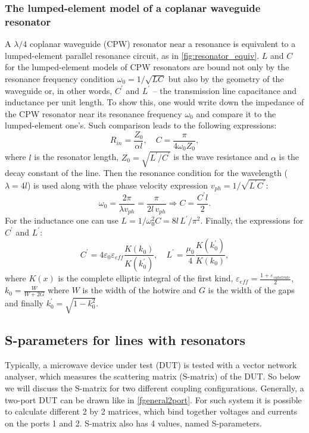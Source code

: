 \documentclass[12pt, twoside]{report}
\numberwithin{equation}{section}
\begin{document}
\subsubsection{The lumped-element model of a coplanar waveguide resonator}\label{ssec:LE-model}
A $\lambda/4$ coplanar waveguide (CPW) resonator near a resonance is equivalent to a lumped-element parallel resonance circuit, as in \autoref{fig:resonator_equiv}. $L$ and $C$ for the lumped-element models of CPW resonators are bound not only by the resonance frequency condition $\omega_0 = 1/\sqrt{LC}$ but also by the geometry of the waveguide or, in other words, $C^\prime$ and $L^\prime$ -- the transmission line capacitance and inductance per unit length. To show this, one would write down the impedance of the CPW resonator near its resonance frequency $\omega_0$ and compare it to the lumped-element one's\cite{pozar2012}. Such comparison leads to the following expressions:
\[
R_{in} = \frac{Z_0}{\alpha l}, \quad C = \frac{\pi}{4\omega_0 Z_0},
\]
where $l$ is the resonator length, $Z_0 = \sqrt{L^\prime/C^\prime}$ is the wave resistance and $\alpha$ is the decay constant of the line. Then the resonance condition for the wavelength ($\lambda = 4 l$) is used along with the phase velocity expression $v_{ph} = 1/\sqrt{L^\prime C^\prime}$:
\[
\omega_0 = \frac{2\pi}{\lambda v_{ph}} =  \frac{\pi}{2 l\, v_{ph}} \Rightarrow  C = \frac{C^\prime l}{2}.
\]
For the inductance one can use $L = 1/\omega_0^2 C = 8 l\, L^\prime/\pi^2$. Finally, the expressions for $C^\prime$ and $L^\prime$:
\[
C^\prime = 4\varepsilon_0\varepsilon_{eff} \frac{K(k_0)}{K(k_0^\prime)},\quad
L^\prime = \frac{\mu_0}{4} \frac{K(k_0^\prime)}{K(k_0)},
\]
where $K(x)$ is the complete elliptic integral of the first kind, $\varepsilon_{eff} = \frac{1+\varepsilon_{substrate}}{2}$, $k_0 = \frac{W}{W+2G}$ where $W$ is the width of the hotwire and $G$ is the width of the gaps and finally $k_0^\prime = \sqrt{1-k_0^2}$.

\subsection{S-parameters for lines with resonators}

Typically, a microwave device under test (DUT) is tested with a vector network analyser, which measures the scattering matrix (S-matrix) of the DUT. So below we will discuss the S-matrix for two different coupling configurations. Generally, a two-port DUT can be drawn like in \autoref{fgeneral2port}. For such system it is possible to calculate different 2 by 2 matrices, which bind together voltages and currents on the ports 1 and 2. S-matrix also has 4 values, named S-parameters.
\end{document}
